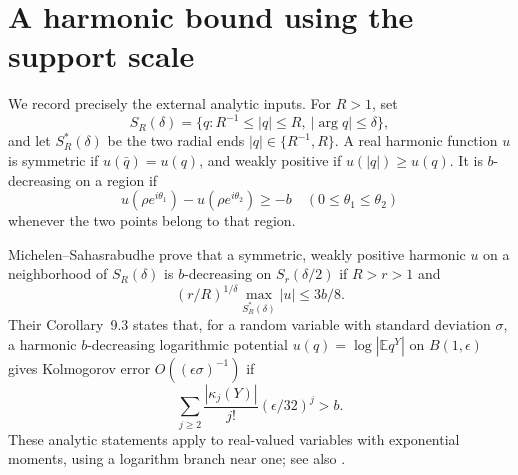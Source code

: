 \documentclass[11pt]{article}
\numberwithin{equation}{section}
\theoremstyle{remark}\newtheorem{remark}[theorem]{Remark}
\newcommand{\E}{\mathbb E}\newcommand{\Pp}{\mathbb P}
\begin{document}
\section{A harmonic bound using the support scale}\label{sec:harmonic}
We record precisely the external analytic inputs. For $R>1$, set
\[
 S_R(\delta)=\{q:R^{-1}\le|q|\le R,\ |\arg q|\le\delta\},
\]
and let $S_R^*(\delta)$ be the two radial ends $|q|\in\{R^{-1},R\}$.
A real harmonic function $u$ is symmetric if $u(\bar q)=u(q)$, and
weakly positive if $u(|q|)\ge u(q)$. It is $b$-decreasing on a region if
\[
 u(\rho e^{i\theta_1})-u(\rho e^{i\theta_2})\ge-b
 \quad(0\le\theta_1\le\theta_2)
\]
whenever the two points belong to that region.

Michelen--Sahasrabudhe \cite[Lemma~4.1]{MS} prove that a symmetric,
weakly positive harmonic $u$ on a neighborhood of $S_R(\delta)$ is
$b$-decreasing on $S_r(\delta/2)$ if $R>r>1$ and
\begin{equation}\label{eq:MS-boundary}
 (r/R)^{1/\delta}\max_{S_R^*(\delta)}|u|\le3b/8.
\end{equation}
Their Corollary~9.3 states that, for a random variable with standard
deviation $\sigma$, a harmonic $b$-decreasing logarithmic potential
$u(q)=\log|\E q^Y|$ on $B(1,\epsilon)$ gives Kolmogorov error
$O((\epsilon\sigma)^{-1})$ if
\begin{equation}\label{eq:MS-cumulants}
 \sum_{j\ge2}\frac{|\kappa_j(Y)|}{j!}
                   (\epsilon/32)^j>b.
\end{equation}
These analytic statements apply to real-valued variables with exponential
moments, using a logarithm branch near one; see also \cite[Section~12]{MS}.
\end{document}

